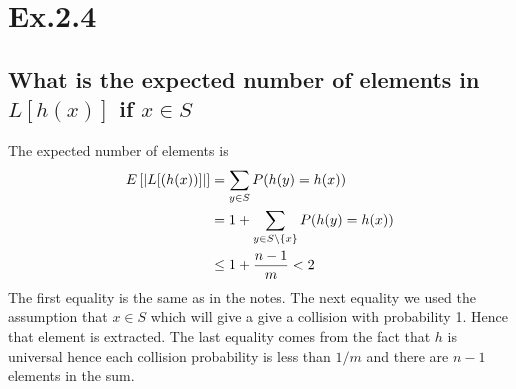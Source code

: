 \section*{Ex.2.4}
\subsection*{What is the expected number of elements in $L[h(x)]$ if $x \in S$}

The expected number of elements is
\begin{align*}
E\left[ \abs*{L[(h(x))]} \right] 
       &= \sum_{y\in S} P(h(y) = h(x)) \\
       &= 1 + \sum_{y\in S\backslash\{x\}} P(h(y) = h(x)) \\
       &\leq 1 + \frac{n-1}{m} < 2
\end{align*}
The first equality is the same as in the notes. The next equality we used the assumption that $x\in S$ which will give a give a collision with probability 1. Hence that element is extracted. The last equality comes from the fact that $h$ is universal hence each collision probability is less than $1/m$ and there are $n-1$ elements in the sum.